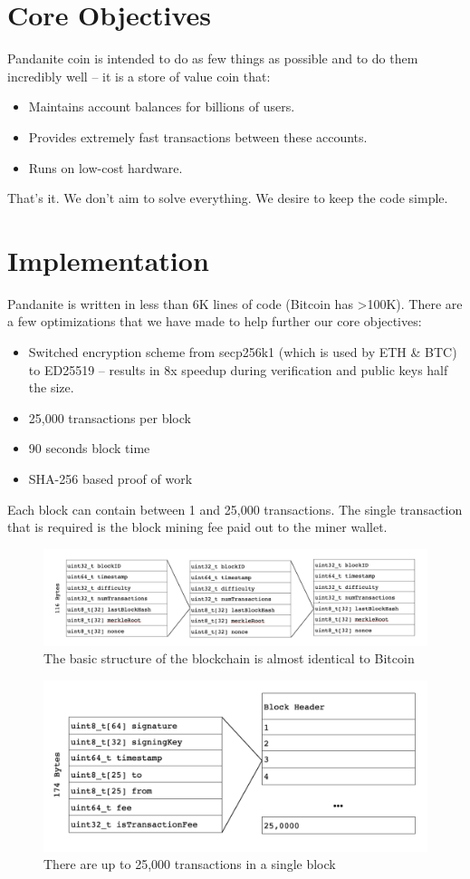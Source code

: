 \documentclass[11pt, a4paper]{elegantpaper}
\begin{document}
\section{Core Objectives}
Pandanite coin is intended to do as few things as possible and to do them incredibly well – it is a
store of value coin that:
\begin{itemize}
	\item Maintains account balances for billions of users.
	\item Provides extremely fast transactions between these accounts.
	\item Runs on low-cost hardware.
\end{itemize}
That’s it. We don’t aim to solve everything. We desire to keep the code simple.
\section{Implementation}
Pandanite is written in less than 6K lines of code (Bitcoin has >100K). There are a few optimizations
that we have made to help further our core objectives:
\begin{itemize}
	\item Switched encryption scheme from secp256k1 (which is used by ETH \& BTC) to ED25519 -- results in 8x speedup during verification and public keys half the size.
	\item 25,000 transactions per block
	\item 90 seconds block time
	\item SHA-256 based proof of work
\end{itemize}
Each block can contain between 1 and 25,000 transactions. The single transaction that is
required is the block mining fee paid out to the miner wallet.
\begin{figure}[h]
\includegraphics[width=\textwidth]{fig1}
\centering
\caption{The basic structure of the blockchain is almost identical to Bitcoin}
\end{figure}
\begin{figure}[h]
\includegraphics[width=\textwidth]{fig2}
\centering
\caption{There are up to 25,000 transactions in a single block}
\end{figure}
\end{document}
